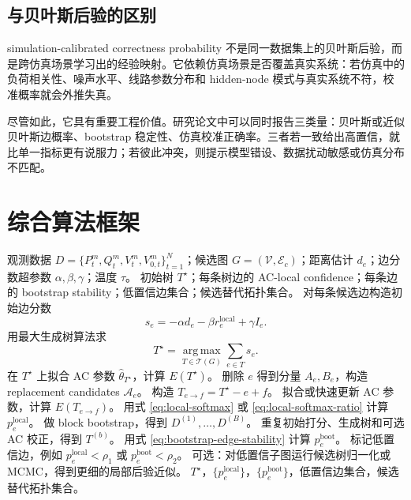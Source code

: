 \documentclass[UTF8,12pt,openany]{ctexrep}
\numberwithin{equation}{chapter}
\theoremstyle{definition}
\theoremstyle{plain}
\newcommand{\argmax}{\operatorname*{arg\,max}}
\newcommand{\Tcal}{\mathcal{T}}
\newcommand{\Acal}{\mathcal{A}}
\begin{document}
\section{与贝叶斯后验的区别}

simulation-calibrated correctness probability 不是同一数据集上的贝叶斯后验，而是跨仿真场景学习出的经验映射。它依赖仿真场景是否覆盖真实系统：若仿真中的负荷相关性、噪声水平、线路参数分布和 hidden-node 模式与真实系统不符，校准概率就会外推失真。

尽管如此，它具有重要工程价值。研究论文中可以同时报告三类量：贝叶斯或近似贝叶斯边概率、bootstrap 稳定性、仿真校准正确率。三者若一致给出高置信，就比单一指标更有说服力；若彼此冲突，则提示模型错设、数据扰动敏感或仿真分布不匹配。

\chapter{综合算法框架}

\begin{algorithm}[H]
\caption{AC Residual-Calibrated Bayesian Edge Confidence for Radial Distribution Topology Identification}
\label{alg:ac-residual-calibrated}
\begin{algorithmic}[1]
\REQUIRE 观测数据 $D=\{P_t^m,Q_t^m,V_t^m,V_{0,t}^m\}_{t=1}^{N}$；候选图 $G=(\mathcal{V},\mathcal{E}_c)$；距离估计 $d_e$；边分数超参数 $\alpha,\beta,\gamma$；温度 $\tau$。
\ENSURE 初始树 $T^\star$；每条树边的 AC-local confidence；每条边的 bootstrap stability；低置信边集合；候选替代拓扑集合。
\STATE 对每条候选边构造初始边分数
\[
s_e=-\alpha d_e-\beta r_e^{\mathrm{local}}+\gamma I_e .
\]
\STATE 用最大生成树算法求
\[
T^\star=\argmax_{T\in\Tcal(G)}\sum_{e\in T}s_e .
\]
\STATE 在 $T^\star$ 上拟合 AC 参数 $\hat\theta_{T^\star}$，计算 $E(T^\star)$。
  \STATE 删除 $e$ 得到分量 $A_e,B_e$，构造 replacement candidates $\Acal_e$。
  \FOR{每条替代边 $f\in\Acal_e$}
    \STATE 构造 $T_{e\to f}=T^\star-e+f$。
    \STATE 拟合或快速更新 AC 参数，计算 $E(T_{e\to f})$。
  \ENDFOR
  \STATE 用式 \eqref{eq:local-softmax} 或 \eqref{eq:local-softmax-ratio} 计算 $p_e^{\mathrm{local}}$。
\ENDFOR
\STATE 做 block bootstrap，得到 $D^{(1)},\ldots,D^{(B)}$。
  \STATE 重复初始打分、生成树和可选 AC 校正，得到 $T^{(b)}$。
\ENDFOR
\STATE 用式 \eqref{eq:bootstrap-edge-stability} 计算 $p_e^{\mathrm{boot}}$。
\STATE 标记低置信边，例如 $p_e^{\mathrm{local}}<\rho_1$ 或 $p_e^{\mathrm{boot}}<\rho_2$。
\STATE 可选：对低置信子图运行候选树归一化或 MCMC，得到更细的局部后验近似。
\RETURN $T^\star$，$\{p_e^{\mathrm{local}}\}$，$\{p_e^{\mathrm{boot}}\}$，低置信边集合，候选替代拓扑集合。
\end{algorithmic}
\end{algorithm}
\end{document}
